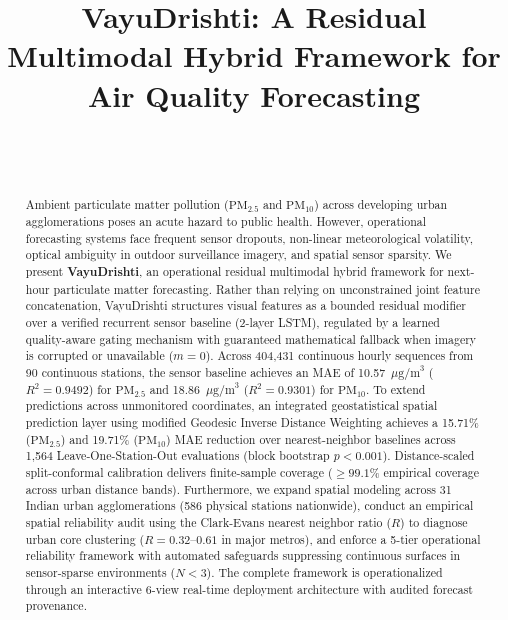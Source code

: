 \documentclass[conference]{IEEEtran}
\begin{document}
\title{VayuDrishti: A Residual Multimodal Hybrid Framework for Air Quality Forecasting}

\author{
\\
\\
}

\maketitle

\begin{abstract}
Ambient particulate matter pollution ($\text{PM}_{2.5}$ and $\text{PM}_{10}$) across developing urban agglomerations poses an acute hazard to public health. However, operational forecasting systems face frequent sensor dropouts, non-linear meteorological volatility, optical ambiguity in outdoor surveillance imagery, and spatial sensor sparsity. We present \textbf{VayuDrishti}, an operational residual multimodal hybrid framework for next-hour particulate matter forecasting. Rather than relying on unconstrained joint feature concatenation, VayuDrishti structures visual features as a bounded residual modifier over a verified recurrent sensor baseline (2-layer LSTM), regulated by a learned quality-aware gating mechanism with guaranteed mathematical fallback when imagery is corrupted or unavailable ($m=0$). Across 404,431 continuous hourly sequences from 90 continuous stations, the sensor baseline achieves an MAE of 10.57~$\mu\text{g/m}^3$ ($R^2 = 0.9492$) for $\text{PM}_{2.5}$ and 18.86~$\mu\text{g/m}^3$ ($R^2 = 0.9301$) for $\text{PM}_{10}$. To extend predictions across unmonitored coordinates, an integrated geostatistical spatial prediction layer using modified Geodesic Inverse Distance Weighting achieves a 15.71\% ($\text{PM}_{2.5}$) and 19.71\% ($\text{PM}_{10}$) MAE reduction over nearest-neighbor baselines across 1,564 Leave-One-Station-Out evaluations (block bootstrap $p < 0.001$). Distance-scaled split-conformal calibration delivers finite-sample coverage ($\ge 99.1\%$ empirical coverage across urban distance bands). Furthermore, we expand spatial modeling across 31 Indian urban agglomerations (586 physical stations nationwide), conduct an empirical spatial reliability audit using the Clark-Evans nearest neighbor ratio ($R$) to diagnose urban core clustering ($R = 0.32\text{--}0.61$ in major metros), and enforce a 5-tier operational reliability framework with automated safeguards suppressing continuous surfaces in sensor-sparse environments ($N < 3$). The complete framework is operationalized through an interactive 6-view real-time deployment architecture with audited forecast provenance.
\end{abstract}
\end{document}
